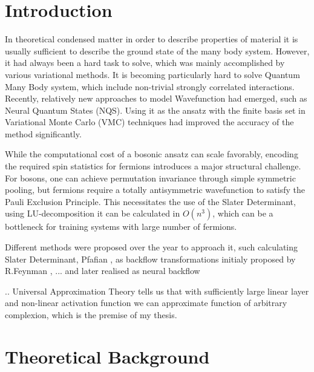 \documentclass[a4paper,11pt,twoside]{article}
\begin{document}
\section{Introduction}

In theoretical condensed matter in order to describe properties of material it is usually sufficient to describe the ground state of the many body system. However, it had always been a hard task to solve, which was mainly accomplished by various variational methods. It is becoming particularly hard to solve Quantum Many Body system, which include non-trivial strongly correlated interactions. 
Recently, relatively new approaches to model Wavefunction had emerged, such as Neural Quantum States (NQS)\cite{carleo_solving_2017}. Using it as the ansatz with the finite basis set in Variational Monte Carlo (VMC) techniques had improved the accuracy of the method significantly. 



While the computational cost of a bosonic ansatz can scale favorably, encoding the required spin statistics for fermions introduces a major structural challenge. For bosons, one can achieve permutation invariance through simple symmetric pooling, but fermions require a totally antisymmetric wavefunction to satisfy the Pauli Exclusion Principle. This necessitates the use of the Slater Determinant, using LU-decomposition it can be calculated in $O(n^3)$, which can be a bottleneck for training systems with large number of fermions. 

Different methods were proposed over the year to approach it, such calculating Slater Determinant, Pfafian ,  as backflow transformations initialy proposed by R.Feynman  \cite{feynman_energy_nodate} , ...  and later realised as neural backflow \cite{pfau_ab_2020}


.. Universal Approximation Theory tells us that with sufficiently large linear layer and non-linear activation function we can approximate function of arbitrary complexion, which is the premise of my thesis. 


\newpage




\thispagestyle{plain}


\section{Theoretical Background}
\end{document}
